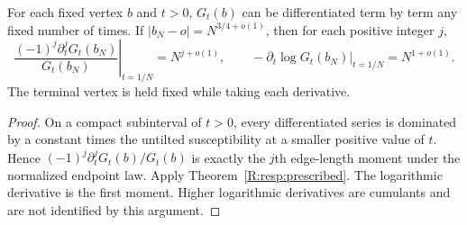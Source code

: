 \begin{corollary}\label{R:resp:thermal-derivatives}
For each fixed vertex $b$ and $t>0$, $G_t(b)$ can be differentiated term by term any fixed number of times. If $|b_N-o|=N^{3/4+o(1)}$, then for each positive integer $j$,
\[
 \left.\frac{(-1)^j\partial_t^jG_t(b_N)}{G_t(b_N)}\right|_{t=1/N}
       =N^{j+o(1)},\qquad
 -\left.\partial_t\log G_t(b_N)\right|_{t=1/N}=N^{1+o(1)}.
\]
The terminal vertex is held fixed while taking each derivative.
\end{corollary}
\begin{proof}
On a compact subinterval of $t>0$, every differentiated series is dominated by a constant times the untilted susceptibility at a smaller positive value of $t$. Hence
$(-1)^j\partial_t^jG_t(b)/G_t(b)$ is exactly the $j$th edge-length moment under the normalized endpoint law. Apply Theorem~\ref{R:resp:prescribed}. The logarithmic derivative is the first moment. Higher logarithmic derivatives are cumulants and are not identified by this argument.
\end{proof}
